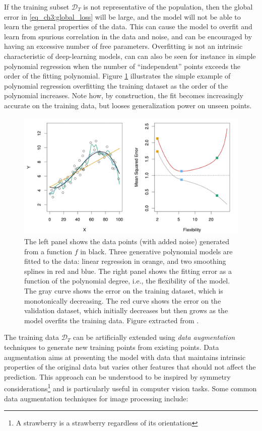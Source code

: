 If the training subset $\mathcal{D}_T$ is not representative of the population, then the global error in \cref{eq_ch3:global_loss} will be large, and the model will not be able to learn the general properties of the data.
This can cause the model to overfit and learn from spurious correlation in the data and noise, and can be encouraged by having an excessive number of free parameters.
Overfitting is not an intrinsic characteristic of deep-learning models, can can also be seen for instance in simple polynomial regression when the number of ``independent'' points exceeds the order of the fitting polynomial.
Figure \ref{fig:ML overfit poly} illustrates the simple example of polynomial regression overfitting the training dataset as the order of the polynomial increases. Note how, by construction, the fit becomes increasingly accurate on the training data, but looses generalization power on unseen points.
\begin{figure}
    \centering
    \includegraphics[width=0.7\linewidth]{img/ML/poly_overfit.png}
    \caption{The left panel shows the data points (with added noise) generated from a function $f$ in black. Three generative polynomial models are fitted to the data: linear regression in orange, and two smoothing splines in red and blue. The right panel shows the fitting error as a function of the polynomial degree, i.e., the flexibility of the model. The gray curve shows the error on the training dataset, which is monotonically decreasing. The red curve shows the error on the validation dataset, which initially decreases but then grows as the model overfits the training data. Figure extracted from \cite{James2021}. }
    \label{fig:ML overfit poly}
\end{figure}

The training data $\mathcal{D}_T$ can be artificially extended using \emph{data augmentation} techniques \cite{data_augmentation} to generate new training points from existing points. Data augmentation aims at presenting the model with data that maintains intrinsic properties of the original data but varies other features that should not affect the prediction. This approach can be understood to be inspired by symmetry considerations\footnote{A strawberry is a strawberry regardless of its orientation} and is particularly useful in computer vision tasks. Some common data augmentation techniques for image processing include:

